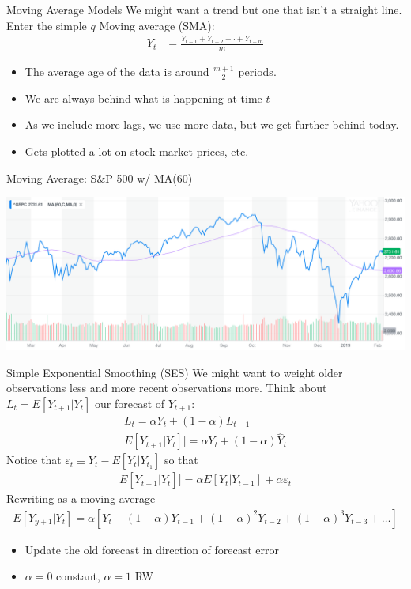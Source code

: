 \begin{frame}{Moving Average Models}
 We might want a \alert{trend} but one that isn't a straight line.\\ Enter the simple $q$ Moving average (SMA):
\begin{align*}
Y_t &= \frac{Y_{t-1}+ Y_{t-2} + \cdot + Y_{t-m}}{m}
\end{align*}
\begin{itemize}
\item The average \alert{age} of the data is around $\frac{m+1}{2}$ periods.
\item We are always behind what is happening at time $t$
\item As we include more lags, we use more data, but we get further behind today.
\item Gets plotted a lot on stock market prices, etc.
\end{itemize}
\end{frame}

\begin{frame}{Moving Average: S\&P 500 w/ MA(60)}
\begin{center}
\includegraphics[width=5.5in]{./resources/sp-chart.png}
\end{center}
\end{frame}

\begin{frame}{Simple Exponential Smoothing (SES)}
We might want to weight older observations less and more recent observations more. Think about $L_t=E[Y_{t+1}|Y_t]$ our forecast of $Y_{t+1}$:
\begin{align*}
L_t = \alpha Y_t + (1-\alpha) L_{t-1}\\
E[Y_{t+1}|Y_t]] = \alpha Y_t + (1-\alpha) \hat{Y}_{t}
\end{align*}
Notice that $\varepsilon_t \equiv Y_t - E[Y_t| Y_{t_1}]$ so that
\begin{align*}
E[Y_{t+1}|Y_t]] = \alpha E[Y_t| Y_{t-1}] + \alpha \varepsilon_t
\end{align*}
Rewriting as a \alert{moving average}
\begin{align*}
E[Y_{y+1} | Y_t] = \alpha [ Y_t + (1-\alpha)Y_{t-1} + (1-\alpha)^2 Y_{t-2} + (1-\alpha)^3 Y_{t-3} + \ldots]
\end{align*}
\begin{itemize}
    \item Update the old forecast in direction of forecast error
    \item $\alpha=0$ constant, $\alpha=1$ RW
\end{itemize}
\end{frame}


